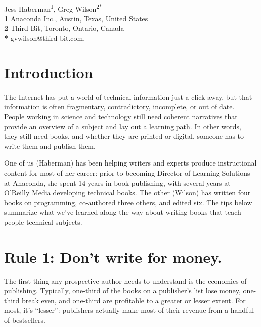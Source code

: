 \documentclass[10pt,letterpaper]{article}
\begin{document}
\vspace*{0.2in}

\begin{flushleft}
{\Large
\textbf{}
}
\newline
\\
{Jess Haberman}\textsuperscript{1},
{Greg Wilson}\textsuperscript{2*}
\\
\bigskip
\textbf{1} Anaconda Inc., Austin, Texas, United States\\
\textbf{2} Third Bit, Toronto, Ontario, Canada\\
\textbf{*} gvwilson@third-bit.com.
\end{flushleft}

\section*{Introduction}

The Internet has put a world of technical information just a click
away, but that information is often fragmentary, contradictory,
incomplete, or out of date. People working in science and technology
still need coherent narratives that provide an overview of a subject
and lay out a learning path. In other words, they still need books,
and whether they are printed or digital, someone has to write them and
publish them.

One of us (Haberman) has been helping writers and experts produce
instructional content for most of her career: prior to becoming Director
of Learning Solutions at Anaconda, she spent 14 years in book
publishing, with several years at O'Reilly Media developing technical
books. The other (Wilson) has written four books on
programming, co-authored three others, and edited six. The tips below
summarize what we've learned along the way about writing books that
teach people technical subjects.

\section*{Rule 1: Don't write for money.}

The first thing any prospective author needs to understand is the
economics of publishing. Typically, one-third of the books on a
publisher's list lose money, one-third break even, and one-third are
profitable to a greater or lesser extent. For most, it's ``lesser'':
publishers actually make most of their revenue from a handful of
bestsellers.
\end{document}
